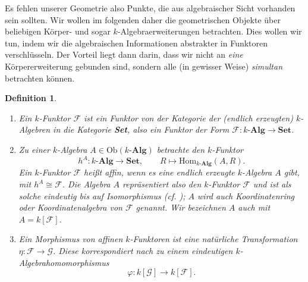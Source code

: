 \documentclass[a4paper, 11pt]{scrartcl}
\newcommand{\Hom}{\text{Hom}}
\newcommand{\Ob}{\text{Ob}}
\newcommand{\F}{\mathcal{F}}
\theoremstyle{basicstyle}
\newtheorem{definition}{Definition}[section]
\begin{document}
    Es fehlen unserer Geometrie also Punkte, die aus algebraischer Sicht vorhanden sein sollten.
    Wir wollen im folgenden daher die geometrischen Objekte über beliebigen Körper- und sogar \(k\)-Algebraerweiterungen betrachten.
    Dies wollen wir tun, indem wir die algebraischen Informationen abstrakter in Funktoren verschlüsseln.
    Der Vorteil liegt dann darin, dass wir nicht an \emph{eine} Körpererweiterung gebunden sind, sondern alle (in gewisser Weise) \emph{simultan} betrachten können.

    \begin{definition}\label{def:2}
        \begin{enumerate}
            \item Ein \emph{\(k\)-Funktor} \(\mathcal{F}\) ist ein Funktor von der Kategorie der (endlich erzeugten) \(k\)-Algebren in die Kategorie \textbf{Set}, also ein Funktor der Form \(\mathcal{F}: k\textbf{-Alg} \to \textbf{Set}\).
            
            \item Zu einer \(k\)-Algebra \(A \in \Ob(k\textbf{-Alg})\) betrachte den \(k\)-Funktor
                \[h^A : k\textbf{-Alg} \longrightarrow \textbf{Set}, \qquad R \mapsto \Hom_{k\textbf{-Alg}}(A, R).\]
                Ein \(k\)-Funktor \(\mathcal{F}\) heißt \emph{affin}, wenn es eine endlich erzeugte \(k\)-Algebra \(A\) gibt, mit \(h^A \cong \mathcal{F}\).
                Die Algebra \(A\) \emph{repräsentiert} also den \(k\)-Funktor \(\mathcal{F}\) und ist als solche eindeutig bis auf Isomorphismus (cf. ); \(A\) wird auch \emph{Koordinatenring} oder \emph{Koordinatenalgebra} von \(\mathcal{F}\) genannt.
                Wir bezeichnen \(A\) auch mit \(A = k[\mathcal{F}]\).

            \item Ein Morphismus von affinen \(k\)-Funktoren ist eine natürliche Transformation \(\eta: \F \to \mathcal{G}\).
                Diese korrespondiert nach  zu einem eindeutigen \(k\)-Algebrahomomorphismus \[\varphi: k[\mathcal{G}] \to k[\F].\]
        \end{enumerate}
    \end{definition}
\end{document}
